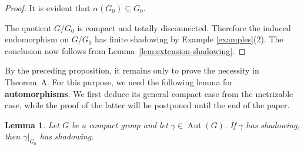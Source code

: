 \documentclass[12pt]{amsart}
\newtheorem{lemma}[theorem]{Lemma}
\theoremstyle{definition}
\numberwithin{equation}{section}
\theoremstyle{remark}
\begin{document}
\begin{proof}
It is evident that
$
\alpha(G_0)\subseteq G_0.
$

The quotient $G/G_0$ is compact and totally disconnected. Therefore
the induced endomorphism on $G/G_0$ has finite shadowing by Example \ref{examples}(2). The conclusion
now follows from Lemma~\ref{lem:extension-shadowing}.
\end{proof}




By the preceding proposition, it remains only to prove the necessity in Theorem~A. For this purpose, we need the following lemma for \textbf{automorphisms}. We first deduce its general compact case from the metrizable case, while the proof of the latter will be postponed until the end of the paper.




\begin{lemma}\label{lem:aut-component}
	Let $G$ be a compact group and let
	$\gamma\in\operatorname{Aut}(G)$. If $\gamma$ has shadowing, then
	$\gamma|_{G_0}$ has shadowing.
\end{lemma}
\end{document}
